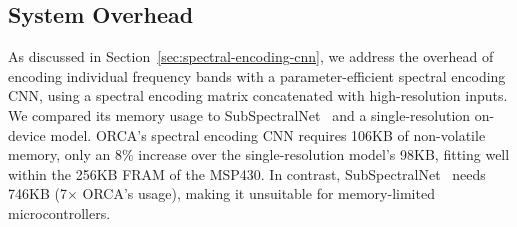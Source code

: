 \subsection{System Overhead}

As discussed in Section~\ref{sec:spectral-encoding-cnn}, we address the overhead of encoding individual frequency bands with a parameter-efficient spectral encoding CNN, using a spectral encoding matrix concatenated with high-resolution inputs. We compared its memory usage to SubSpectralNet~\cite{phaye2019subspectralnet} and a single-resolution on-device model. ORCA’s spectral encoding CNN requires 106KB of non-volatile memory, only an 8\% increase over the single-resolution model’s 98KB, fitting well within the 256KB FRAM of the MSP430. In contrast, SubSpectralNet~\cite{phaye2019subspectralnet} needs 746KB (7$\times$ ORCA’s usage), making it unsuitable for memory-limited microcontrollers.






